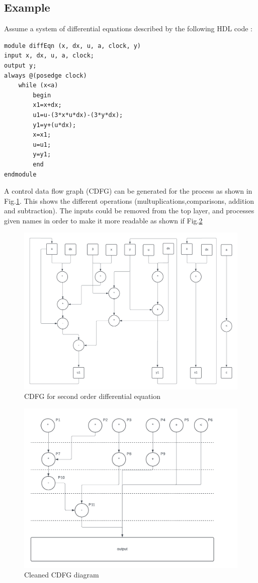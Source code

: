 \documentclass[conference]{IEEEtran}
\begin{document}
\subsection{Example}
Assume a system of differential equations described by the following HDL code :
\begin{verbatim}
module diffEqn (x, dx, u, a, clock, y)
input x, dx, u, a, clock;
output y;
always @(posedge clock)
    while (x<a)
        begin
        x1=x+dx;
        u1=u-(3*x*u*dx)-(3*y*dx);
        y1=y+(u*dx);
        x=x1;
        u=u1;
        y=y1;
        end
endmodule
\end{verbatim}
A control data flow graph (CDFG) can be generated for the process as shown in Fig.\ref{fig:CDFG}. This shows the different operations (multuplications,comparisons, addition and subtraction). The inputs could be removed from the top layer, and processes given names in order to make it more readable as shown if Fig.\ref{fig:cdfg_cleaned}
\begin{figure}[h]
    \centering
    \includegraphics[scale=0.3]{cdfg.png}
    \caption{CDFG for second order differential equation}
    \label{fig:CDFG}
\end{figure}
\begin{figure}[h]
    \centering
    \includegraphics[scale=0.4]{CDFG CLEANED.png}
    \caption{Cleaned CDFG diagram}
    \label{fig:cdfg_cleaned}
\end{figure}
\end{document}
